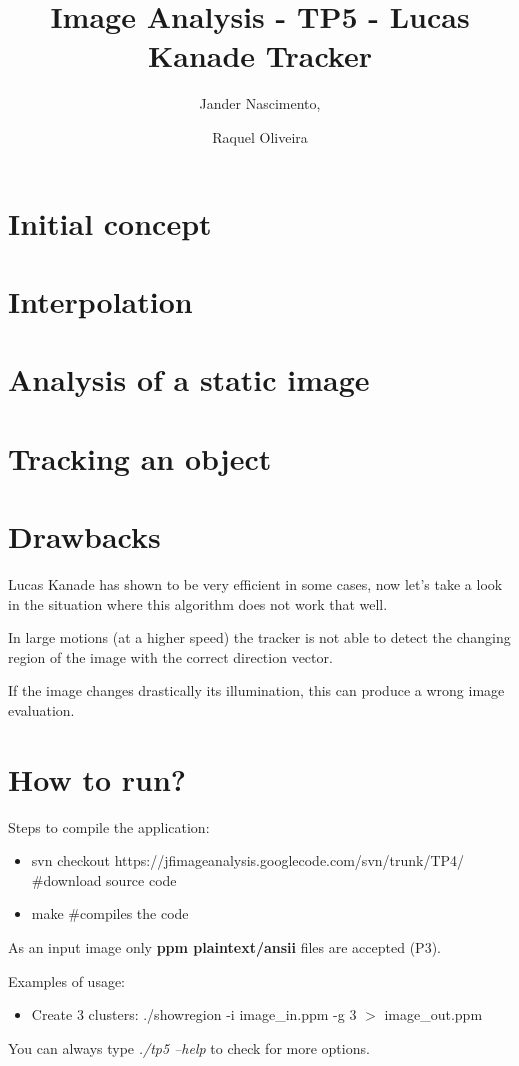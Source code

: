 \documentclass{article}
\begin{document}
\title{Image Analysis - TP5 - Lucas Kanade Tracker}

\author{Jander Nascimento, 
\and Raquel Oliveira}

\maketitle

\section{Initial concept}


\section{Interpolation}


\section{Analysis of a static image}


\section{Tracking an object}


\section{Drawbacks}

Lucas Kanade has shown to be very efficient in some cases, now let's take a look in the situation where this algorithm does not work that well.

In large motions (at a higher speed) the tracker is not able to detect the changing region of the image with the correct direction vector.

If the image changes drastically its illumination, this can produce a wrong image evaluation.

\section{How to run?}

	Steps to compile the application:
	
	\begin{itemize}
		\item svn checkout https://jfimageanalysis.googlecode.com/svn/trunk/TP4/ \#download source code
		\item make \#compiles the code
	\end{itemize}

	As an input image only {\bf ppm plaintext/ansii} files are accepted (P3). 

	Examples of usage:

	\begin{itemize}
		\item Create 3 clusters:
		\subitem ./showregion -i image\_in.ppm -g 3 $>$ image\_out.ppm
	\end{itemize}

	You can always type {\it ./tp5 --help} to check for more options. 
\end{document}
